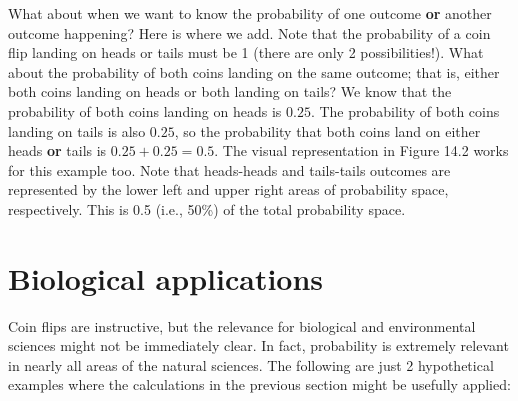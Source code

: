 \documentclass[
]{scrbook}
\begin{document}
What about when we want to know the probability of one outcome \textbf{or} another outcome happening?
Here is where we add.
Note that the probability of a coin flip landing on heads or tails must be 1 (there are only 2 possibilities!).
What about the probability of both coins landing on the same outcome; that is, either both coins landing on heads or both landing on tails?
We know that the probability of both coins landing on heads is \(0.25\).
The probability of both coins landing on tails is also \(0.25\), so the probability that both coins land on either heads \textbf{or} tails is \(0.25 + 0.25 = 0.5\).
The visual representation in Figure 14.2 works for this example too.
Note that heads-heads and tails-tails outcomes are represented by the lower left and upper right areas of probability space, respectively.
This is 0.5 (i.e., 50\%) of the total probability space.

\hypertarget{biological-applications}{%
\section{Biological applications}\label{biological-applications}}

Coin flips are instructive, but the relevance for biological and environmental sciences might not be immediately clear.
In fact, probability is extremely relevant in nearly all areas of the natural sciences.
The following are just 2 hypothetical examples where the calculations in the previous section might be usefully applied:
\end{document}
